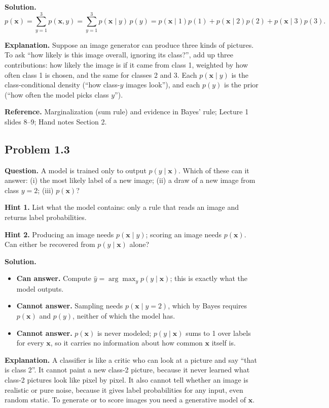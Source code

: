 \documentclass[11pt]{article}
\begin{document}
\textbf{Solution.}
\[
p(\mathbf{x}) = \sum_{y=1}^{3} p(\mathbf{x}, y) = \sum_{y=1}^{3} p(\mathbf{x} \mid y)\, p(y)
= p(\mathbf{x}\mid 1)p(1) + p(\mathbf{x}\mid 2)p(2) + p(\mathbf{x}\mid 3)p(3).
\]

\textbf{Explanation.} Suppose an image generator can produce three kinds of pictures. To ask ``how likely is this image overall, ignoring its class?'', add up three contributions: how likely the image is if it came from class 1, weighted by how often class 1 is chosen, and the same for classes 2 and 3. Each $p(\mathbf{x}\mid y)$ is the class-conditional density (``how class-$y$ images look''), and each $p(y)$ is the prior (``how often the model picks class $y$'').

\textbf{Reference.} Marginalization (sum rule) and evidence in Bayes' rule; Lecture 1 slides 8--9; Hand notes Section 2.

\subsection*{Problem 1.3}
\textbf{Question.} A model is trained only to output $p(y \mid \mathbf{x})$. Which of these can it answer: (i) the most likely label of a new image; (ii) a draw of a new image from class $y=2$; (iii) $p(\mathbf{x})$?

\textbf{Hint 1.} List what the model contains: only a rule that reads an image and returns label probabilities.

\textbf{Hint 2.} Producing an image needs $p(\mathbf{x}\mid y)$; scoring an image needs $p(\mathbf{x})$. Can either be recovered from $p(y\mid\mathbf{x})$ alone?

\textbf{Solution.}
\begin{itemize}
\item[(i)] \textbf{Can answer.} Compute $\hat{y} = \arg\max_y p(y \mid \mathbf{x})$; this is exactly what the model outputs.
\item[(ii)] \textbf{Cannot answer.} Sampling needs $p(\mathbf{x} \mid y=2)$, which by Bayes requires $p(\mathbf{x})$ and $p(y)$, neither of which the model has.
\item[(iii)] \textbf{Cannot answer.} $p(\mathbf{x})$ is never modeled; $p(y\mid\mathbf{x})$ sums to 1 over labels for every $\mathbf{x}$, so it carries no information about how common $\mathbf{x}$ itself is.
\end{itemize}

\textbf{Explanation.} A classifier is like a critic who can look at a picture and say ``that is class 2''. It cannot paint a new class-2 picture, because it never learned what class-2 pictures look like pixel by pixel. It also cannot tell whether an image is realistic or pure noise, because it gives label probabilities for any input, even random static. To generate or to score images you need a generative model of $\mathbf{x}$.
\end{document}
